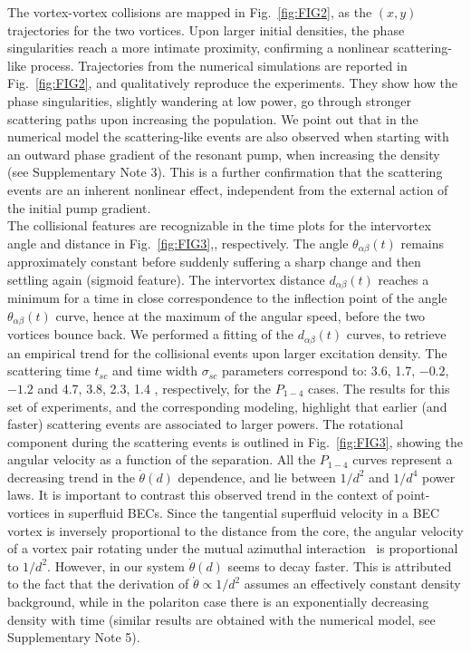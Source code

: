 \documentclass[aps,prb,twocolumn,superscriptaddress,nofootinbib]{revtex4}
\def\editr#1{#1}
\def\edstrike#1{}
\begin{document}
The vortex-vortex collisions are mapped in Fig.~\ref{fig:FIG2}, as the $(x,y)$
trajectories for the two vortices\edstrike{ labeled as $\alpha$ and $\beta$}.
%
Upon larger initial densities,
the phase singularities reach a more intimate proximity,
confirming a nonlinear scattering-like process.
%
Trajectories from the numerical simulations are reported in Fig.~\ref{fig:FIG2},
and qualitatively reproduce the experiments.
They show how the phase singularities,
slightly wandering at low power, go through stronger
scattering paths upon increasing the population.
%
We point out that in the numerical model
the scattering-like events are also observed
when starting with an outward phase gradient of the resonant pump,
 when increasing the density (\editr{see Supplementary Note 3}).
This is a further confirmation that the scattering events are an inherent nonlinear effect,
independent from the external action of the initial pump gradient.\\
%

The collisional features are recognizable in the time plots for
the intervortex angle and distance in Fig.~\ref{fig:FIG3},, respectively.
%
The angle $\theta_{\alpha\beta}(t)$ remains approximately
constant before suddenly suffering a sharp change and then settling again
(sigmoid feature).
%
The intervortex distance $d_{\alpha\beta}(t)$ reaches a minimum for a time in
close correspondence to the inflection point of the angle $\theta_{\alpha\beta}(t)$ curve,
hence at the maximum of the angular speed, before the two vortices bounce back.
%
We performed a fitting of the $d_{\alpha\beta}(t)$ curves, to retrieve an empirical trend
for the collisional events upon larger excitation density.
The scattering time $t_{sc}$ and time width $\sigma_{sc}$ parameters correspond to:
3.6, 1.7, $-0.2$, $-1.2$  and 4.7, 3.8, 2.3, 1.4 , respectively,
for the $P_{1-4}$ cases.
%
The results for this set of experiments, and the corresponding modeling,
highlight that earlier (and faster) scattering events are associated to larger powers.
%
The rotational component during the scattering events is outlined
in Fig.~\ref{fig:FIG3},
showing the angular velocity as a function of the separation.
All the $P_{1-4}$ curves represent a decreasing trend in the
$\dot{\theta}(d)$ dependence,
and lie between $1/d^2$ and $1/d^4$ power laws.
%
It is important to contrast this observed trend in the context of point-vortices
in superfluid BECs.
Since the tangential superfluid velocity in a BEC vortex
is inversely proportional to the distance from the core,
the angular velocity of a vortex pair rotating under the mutual azimuthal interaction~\cite{Jackson1998,DarkBook,Kevrekidis_MPLB_2004}
is proportional to $1/d^2$.
%
However, in our system $\dot\theta(d)$ seems to decay faster.
%
This is attributed to the fact that the derivation of $\dot\theta\propto 1/d^2$
assumes an effectively constant density background, while in the polariton
case there is an exponentially decreasing density with time (similar
results are obtained with the numerical model, \editr{see Supplementary Note 5}).\\
%
\end{document}
